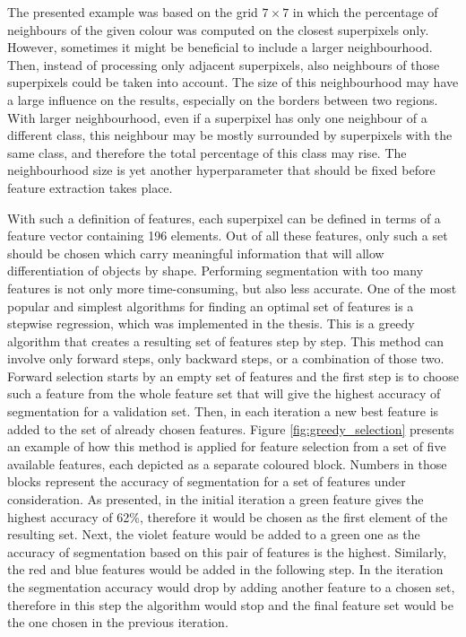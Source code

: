 The presented example was based on the grid $7 \times 7$ in which the percentage of neighbours of the given colour was computed on the closest superpixels only. However, sometimes it might be beneficial to include a larger neighbourhood. Then, instead of processing only adjacent superpixels, also neighbours of those superpixels could be taken into account. The size of this neighbourhood may have a large influence on the results, especially on the borders between two regions. With larger neighbourhood, even if a superpixel has only one neighbour of a different class, this neighbour may be mostly surrounded by superpixels with the same class, and therefore the total percentage of this class may rise. The neighbourhood size is yet another hyperparameter that should be fixed before feature extraction takes place.

With such a definition of features, each superpixel can be defined in terms of a feature vector containing 196 elements. Out of all these features, only such a set should be chosen which carry meaningful information that will allow differentiation of objects by shape. Performing segmentation with too many features is not only more time-consuming, but also less accurate. One of the most popular and simplest algorithms for finding an optimal set of features is a stepwise regression, which was implemented in the thesis. This is a greedy algorithm that creates a resulting set of features step by step. This method can involve only forward steps, only backward steps, or a combination of those two. Forward selection starts by an empty set of features and the first step is to choose such a feature from the whole feature set that will give the highest accuracy of segmentation for a validation set. Then, in each iteration a new best feature is added to the set of already chosen features. Figure \ref{fig:greedy_selection} presents an example of how this method is applied for feature selection from a set of five available features, each depicted as a separate coloured block. Numbers in those blocks represent the accuracy of segmentation for a set of features under consideration. As presented, in the initial iteration a green feature gives the highest accuracy of 62\%, therefore it would be chosen as the first element of the resulting set. Next, the violet feature would be added to a green one as the accuracy of segmentation based on this pair of features is the highest. Similarly, the red and blue features would be added in the following step. In the  iteration the segmentation accuracy would drop by adding another feature to a chosen set, therefore in this step the algorithm would stop and the final feature set would be the one chosen in the previous iteration.
